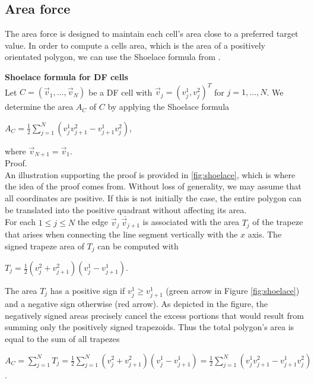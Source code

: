 \subsection{Area force}
The area force is designed to maintain each cell's area close to a preferred target value. 
In order to compute a cells area, which is the area of a positively orientated polygon, we can use the Shoelace formula from \cite{Shoelace2014}. 

\begin{proposition}  \textbf{Shoelace formula for DF cells} \label{prop:Shoelace}\\ 
	Let $C = (\vec{v}_1, \ldots, \vec{v}_N)$ be a DF cell with $\vec{v}_j = (v_j^1, v_j^2)^T$ for $j=1,\ldots,N$.
	We determine the area $A_C$ of $C$ by applying the Shoelace formula
	\begin{center}
		$A_C = \frac{1}{2}\sum\limits_{j = 1}^{N} (v_j^1 v_{j+1}^2 - v_{j+1}^1 v_j^2)$,
	\end{center} 
	where $\vec{v}_{N + 1} = \vec{v}_1$. \\
	Proof. 	\\
	An illustration supporting the proof is provided in \ref{fig:shoelace}, which is where the idea of the proof comes from. 
	Without loss of generality, we may assume that all coordinates are positive.
	If this is not initially the case, the entire polygon can be translated into the positive quadrant without affecting its area. \\
	For each $1 \leq j \leq N$ the edge $\overline{ \vec{v}_j \: \vec{v}_{j+1}}$ is associated with the area $T_j$ of the trapeze that arises when connecting the line segment vertically with the $x$ axis. 
	The signed trapeze area of $T_j$ can be computed with 
	\begin{center}
		$T_j = \frac{1}{2} (v_j^2 + v_{j+1}^2)(v_j^1 - v_{j+1}^1)$.
	\end{center}
	The area $T_j$ has a positive sign if $v_j^1 \geq v_{j+1}^1$ (green arrow in Figure \ref{fig:shoelace}) and a negative sign otherwise (red arrow). 
	As depicted in the figure, the negatively signed areas precisely cancel the excess portions that would result from summing only the positively signed trapezoids.
	Thus the total polygon's area is equal to the sum of all trapezes
	\begin{center}
		$A_C = \sum\limits_{j = 1}^{N} T_j = \frac{1}{2} \sum\limits_{j = 1}^{N} (v_j^2 + v_{j+1}^2)(v_j^1 - v_{j+1}^1) = \frac{1}{2}\sum\limits_{j = 1}^{N} (v_j^1 v_{j+1}^2 - v_{j+1}^1 v_j^2) $.
	\end{center} 

\end{proposition}
